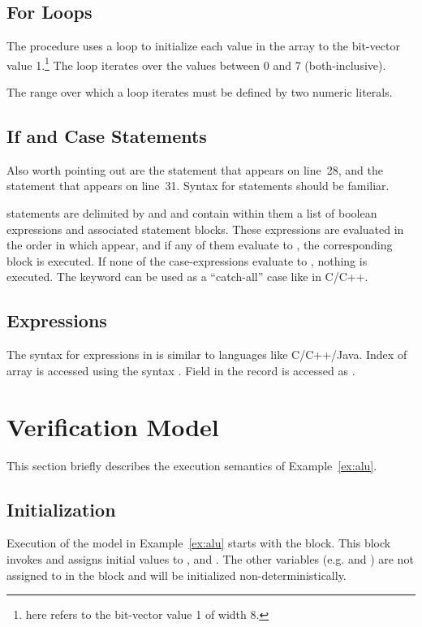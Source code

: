 \subsection{For Loops}
The procedure  uses a  loop to initialize each value in the array  to the bit-vector value 1.\footnote{ here refers to the bit-vector value 1 of width 8.} The loop iterates over the values between 0 and 7 (both-inclusive).

The range over which a  loop iterates must be defined by two numeric literals.

\subsection{If and Case Statements}
Also worth pointing out are the  statement that appears on line~28, and the  statement that appears on line~31. Syntax for  statements should be familiar.

 statements are delimited by  and  and contain within them a list of boolean expressions and associated statement blocks. These expressions are evaluated in the order in which appear, and if any of them evaluate to , the corresponding block is executed. If none of the case-expressions evaluate to , nothing is executed. The keyword  can be used as a ``catch-all'' case like in C/C++.

\subsection{Expressions}

The syntax for expressions in \uclid{} is similar to languages like C/C++/Java. Index  of array  is accessed using the syntax . Field  in the record  is accessed as .

\section{Verification Model}
This section briefly describes the execution semantics of Example~\ref{ex:alu}.

\subsection{Initialization}
Execution of the model in Example~\ref{ex:alu} starts with the  block. This block invokes  and assigns initial values to ,  and . The other variables (e.g.  and ) are not assigned to in the  block and will be initialized non-deterministically.

